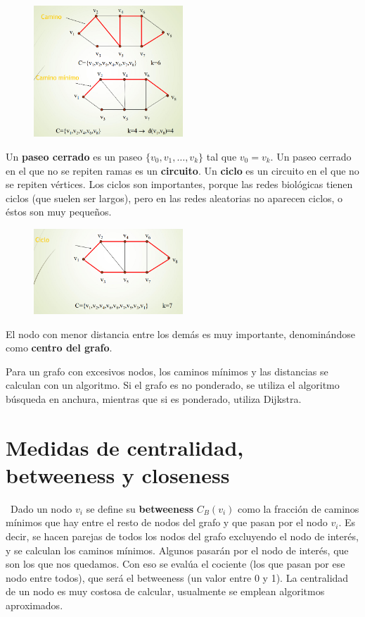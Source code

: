 \begin{figure}[h]
\centering
\includegraphics[width = 0.5\textwidth]{figs/camino-minimo.png}
\end{figure}

Un \textbf{paseo cerrado} es un paseo $\{v_0, v_1, \ldots, v_k\}$ tal que $v_0 = v_k$. Un paseo cerrado en el que no se repiten ramas es un \textbf{circuito}. Un \textbf{ciclo} es un circuito en el que no se repiten vértices. Los ciclos son importantes, porque las redes biológicas tienen ciclos (que suelen ser largos), pero en las redes aleatorias no aparecen ciclos, o éstos son muy pequeños.

\begin{figure}[h]
\centering
\includegraphics[width = 0.5\textwidth]{figs/ciclo.png}
\end{figure}

El nodo con menor distancia entre los demás es muy importante, denominándose como \textbf{centro del grafo}.

Para un grafo con excesivos nodos, los caminos mínimos y las distancias se calculan con un algoritmo. Si el grafo es no ponderado, se utiliza el algoritmo búsqueda en anchura, mientras que si es ponderado, utiliza Dijkstra.

\section{Medidas de centralidad, betweeness y closeness}
  \
Dado un nodo $v_i$ se define su \textbf{betweeness} $C_B (v_i)$ como la fracción de caminos mínimos que hay entre el resto de nodos del grafo y que pasan por el nodo $v_i$. Es decir, se hacen parejas de todos los nodos del grafo excluyendo el nodo de interés, y se calculan los caminos mínimos. Algunos pasarán por el nodo de interés, que son los que nos quedamos. Con eso se evalúa el cociente (los que pasan por ese nodo entre todos), que será el betweeness (un valor entre 0 y 1).
La centralidad de un nodo es muy costosa de calcular, usualmente se emplean algoritmos aproximados. 

